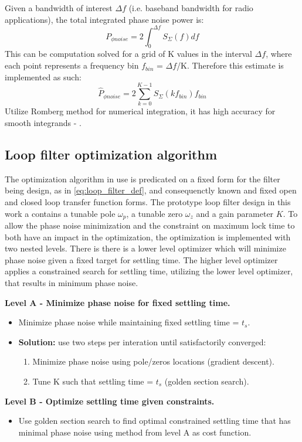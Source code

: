 	Given a bandwidth of interest $\Delta f$ (i.e. baseband bandwidth for radio applications), the total integrated phase noise power is:
	\begin{equation}
		P_{\phi noise} = 2\int_0^{\Delta f} S_{\Sigma}(f)df
	\end{equation}
	This can be computation solved for a grid of K values in the interval $\Delta f$, where each point represents a frequency bin $f_{bin}$ = $\Delta f$/K. Therefore this estimate is implemented as such:
	\begin{equation}
		\hat{P}_{\phi noise} = 2\sum_{k=0}^{K-1} S_{\Sigma}(kf_{bin})f_{bin}
	\end{equation}
	Utilize Romberg method for numerical integration, it has high accuracy for smooth integrands - \cite{numerical_methods_2011}.

\subsection{Loop filter optimization algorithm}
	The optimization algorithm in use is predicated on a fixed form for the filter being design, as in \ref{eq:loop_filter_def}, and consequenctly known and fixed open and closed loop transfer function forms. The prototype loop filter design in this work a contains a tunable pole $\omega_p$, a tunable zero $\omega_z$ and a gain parameter $K$. To allow the phase noise minimization and the constraint on maximum lock time to both have an impact in the optimization, the optimization is implemented with two nested levels. There is there is a lower level optimizer which will minimize phase noise given a fixed target for settling time. The higher level optimizer applies a constrained search for settling time, utilizing the lower level optimizer, that results in minimum phase noise. 

	\textbf{Level A - Minimize phase noise for fixed settling time.}\label{lf_opt}
	\begin{itemize}
		\setlength\itemsep{-0.8em}
		\item Minimize phase noise while maintaining fixed settling time = $t_s$.
		\item \textbf{Solution:} use two steps per interation until satisfactorily converged:
		\begin{enumerate}
			\setlength\itemsep{-0.8em}
			\item Minimize phase noise using pole/zeros locations (gradient descent).
			\item Tune K such that settling time = $t_s$ (golden section search).
		\end{enumerate}

	\end{itemize}
	\textbf{Level B - Optimize settling time given constraints.}
	\begin{itemize}
		\setlength\itemsep{-0.8em}
		\item Use golden section search to find optimal constrained settling time that has minimal phase noise using method from level A as cost function.
	\end{itemize} 

